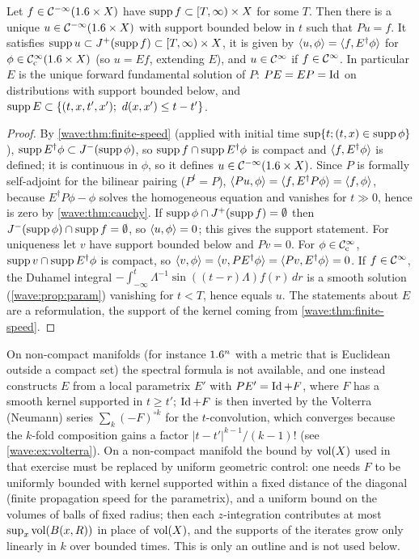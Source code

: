 \begin{theorem}\label{wave:thm:forward}
Let $f\in\mathcal{C}^{-\infty}(1.6\times X)$ have $\operatorname{supp} f\subset[T,\infty)\times X$ for some $T$.
Then there is a unique $u\in\mathcal{C}^{-\infty}(1.6\times X)$ with support bounded below in $t$
such that $Pu=f$. It satisfies $\operatorname{supp} u\subset J^+(\operatorname{supp} f)\subset[T,\infty)\times X$,
it is given by $\langle u, \phi\rangle=\langle f, E^\dagger\phi\rangle$ for
$\phi\in\mathcal{C}^\infty_{\mathrm{c}}(1.6\times X)$ (so $u=Ef$, extending $E$), and $u\in\mathcal{C}^\infty$ if $f\in\mathcal{C}^\infty$.
In particular $E$ is the unique forward fundamental solution of $P$:
$PE=EP=\operatorname{Id}$ on distributions with support bounded below, and
$\operatorname{supp} E\subset\{(t,x,t',x');\ d(x,x')\le t-t'\}$.
\end{theorem}
\begin{proof}
By \cref{wave:thm:finite-speed} (applied with initial time $\sup\{t;(t,x)\in\operatorname{supp}\phi\}$),
$\operatorname{supp} E^\dagger\phi\subset J^-(\operatorname{supp}\phi)$, so $\operatorname{supp} f\cap\operatorname{supp} E^\dagger\phi$ is
compact and $\langle f, E^\dagger\phi\rangle$ is defined; it is continuous in $\phi$, so it
defines $u\in\mathcal{C}^{-\infty}(1.6\times X)$. Since $P$ is formally self-adjoint for the
bilinear pairing ($P^t=P$), $\langle Pu, \phi\rangle=\langle f, E^\dagger P\phi\rangle=\langle f, \phi\rangle$,
because $E^\dagger P\phi-\phi$ solves the homogeneous equation and vanishes for $t\gg0$,
hence is zero by \cref{wave:thm:cauchy}. If $\operatorname{supp}\phi\cap J^+(\operatorname{supp} f)=\emptyset$
then $J^-(\operatorname{supp}\phi)\cap\operatorname{supp} f=\emptyset$, so $\langle u, \phi\rangle=0$; this gives the
support statement. For uniqueness let $v$ have support bounded below and $Pv=0$.
For $\phi\in\mathcal{C}^\infty_{\mathrm{c}}$, $\operatorname{supp} v\cap\operatorname{supp} E^\dagger\phi$ is compact, so
$\langle v, \phi\rangle=\langle v, PE^\dagger\phi\rangle=\langle Pv, E^\dagger\phi\rangle=0$. If $f\in\mathcal{C}^\infty$,
the Duhamel integral $-\int_{-\infty}^t\Lambda^{-1}\sin((t-r)\Lambda)f(r)\,dr$ is a smooth
solution (\cref{wave:prop:param}) vanishing for $t<T$, hence equals $u$. The
statements about $E$ are a reformulation, the support of the kernel coming from
\cref{wave:thm:finite-speed}.
\end{proof}

\begin{remark}\label{wave:rem:volterra}
On non-compact manifolds (for instance $1.6^n$ with a metric that is Euclidean
outside a compact set) the spectral formula is not available, and one instead
constructs $E$ from a local parametrix $E'$ with $PE'=\operatorname{Id}+F$, where $F$ has a
smooth kernel supported in $t\ge t'$; $\operatorname{Id}+F$ is then inverted by the Volterra
(Neumann) series $\sum_k(-F)^{\circ k}$ for the $t$-convolution, which converges
because the $k$-fold composition gains a factor $|t-t'|^{k-1}/(k-1)!$ (see
\cref{wave:ex:volterra}). On a non-compact manifold the bound by $\operatorname{vol}(X)$ used in
that exercise must be replaced by uniform geometric control: one needs $F$ to be
uniformly bounded with kernel supported within a fixed distance of the diagonal
(finite propagation speed for the parametrix), and a uniform bound on the volumes of
balls of fixed radius; then each $z$-integration contributes at most
$\sup_x\operatorname{vol}(B(x,R))$ in place of $\operatorname{vol}(X)$, and the supports of the iterates grow
only linearly in $k$ over bounded times. This is only an outline and is not used
below.
\end{remark}

